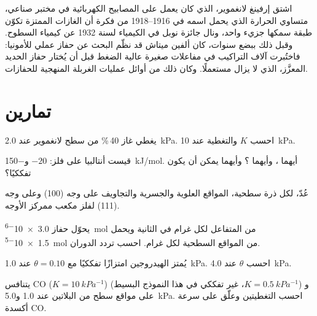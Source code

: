 \begin{history}
اشتق إرفينغ لانغموير، الذي كان يعمل على المصابيح الكهربائية في مختبر صناعي،
متساوي الحرارة الذي يحمل اسمه في 1916--1918 من فكرة أن الغازات الممتزة تكوّن طبقة سمكها
جزيء واحد، ونال جائزة نوبل في الكيمياء لسنة 1932 عن كيمياء
السطوح. وقبل ذلك ببضع سنوات، كان ألفين ميتاش قد نظّم البحث عن
حفاز عملي للأمونيا: فاختُبرت آلاف التراكيب في مفاعلات صغيرة
عالية الضغط قبل أن يُختار حفاز الحديد المعزَّز، الذي لا يزال مستعملًا.
وكان ذلك من أوائل عمليات الغربلة المنهجية للحفازات.
\end{history}

\section{تمارين}

\begin{exercise}[$\star$]\label{exo:b3:surfaces-catalysis:1}
يغطي غاز 40\,\% من سطح لانغموير عند \qty{2.0}{kPa}. احسب $K$ والتغطية عند
\qty{10}{kPa}.
\end{exercise}

\begin{exercise}[$\star$]\label{exo:b3:surfaces-catalysis:2}
قيست أنتالبيا  على فلز: $-20$ و\qty{-150}{kJ/mol}. أيهما
، وأيهما ؟ وأيهما يمكن أن يكون تفككيًا؟
\end{exercise}

\begin{exercise}[$\star$]\label{exo:b3:surfaces-catalysis:3}
عُدّ، لكل ذرة سطحية، المواقع العلوية والجسرية والتجاويف على وجه (100) 
وعلى وجه (111) لفلز مكعب ممركز الأوجه.
\end{exercise}

\begin{exercise}[$\star$]\label{exo:b3:surfaces-catalysis:4}
يحوّل حفاز \qty{3.0e-6}{mol} من المتفاعل لكل غرام في الثانية ويحمل
\qty{1.5e-5}{mol} من المواقع السطحية لكل غرام. احسب تردد الدوران.
\end{exercise}

\begin{exercise}[$\star\star$]\label{exo:b3:surfaces-catalysis:5}
يُمتز الهيدروجين امتزازًا تفككيًا مع $\theta = 0.10$ عند \qty{1.0}{kPa}. احسب $\theta$ عند \qty{4.0}{kPa}.
\end{exercise}

\begin{exercise}[$\star\star$]\label{exo:b3:surfaces-catalysis:6}
يتنافس CO ($K = \qty{10}{kPa^{-1}}$) و ($K = \qty{0.5}{kPa^{-1}}$، غير تفككي في هذا النموذج البسيط)
على مواقع سطح من البلاتين عند 1.0 و\qty{5.0}{kPa}. احسب
التغطيتين وعلّق على سرعة أكسدة CO.
\end{exercise}

